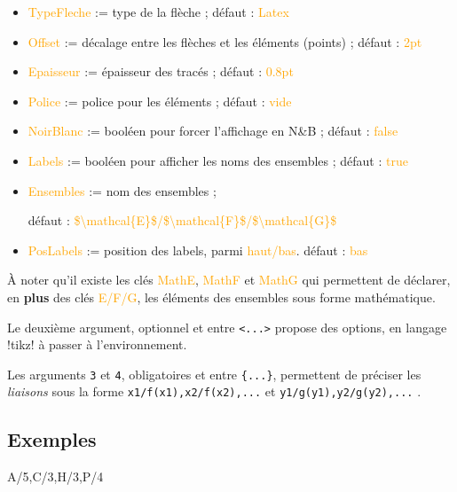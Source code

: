 \documentclass[french,a4paper,11pt]{article}
\newcommand\Cle[1]{{\small\sffamily\textlangle \textcolor{orange}{#1}\textrangle}}
\begin{document}
{{\begin{tipblock}
\begin{itemize}
	\hfill{}défaut : \Cle{teal}
	\item \Cle{TypeFleche} := type de la flèche  ; \hfill{}défaut : \Cle{Latex}
	\item \Cle{Offset} := décalage entre les flèches et les éléments (points) ; \hfill{}défaut : \Cle{2pt}
	\item \Cle{Epaisseur} := épaisseur des tracés ; \hfill{}défaut : \Cle{0.8pt}
	\item \Cle{Police} := police pour les éléments ; \hfill{}défaut : \Cle{vide}
	\item \Cle{NoirBlanc} := booléen pour forcer l'affichage en N\&{}B ; \hfill{}défaut : \Cle{false}
	\item \Cle{Labels} := booléen pour afficher les noms des ensembles ; \hfill{}défaut : \Cle{true}
	\item \Cle{Ensembles} := nom des ensembles  ;

	\hfill{}défaut : \Cle{\$\textbackslash mathcal\{E\}\$/\$\textbackslash  mathcal\{F\}\$/\$\textbackslash  mathcal\{G\}\$}
	\item \Cle{PosLabels} := position des labels, parmi \Cle{haut/bas}. \hfill{}défaut : \Cle{bas}
\end{itemize}

À noter qu'il existe les clés \Cle{MathE}, \Cle{MathF} et \Cle{MathG} qui permettent de déclarer, en \textbf{plus} des clés \Cle{E/F/G}, les éléments des ensembles sous forme mathématique.

\smallskip

Le deuxième argument, optionnel et entre \texttt{<...>} propose des options, en langage \packagetex!tikz! à passer à l'environnement.

\smallskip

Les arguments \texttt{3} et \texttt{4}, obligatoires et entre \texttt{\{...\}}, permettent de préciser les \textit{liaisons} sous la forme \verb!x1/f(x1),x2/f(x2),...! et \verb!y1/g(y1),y2/g(y2),...! .
\end{tipblock}

\subsection{Exemples}

\begin{DemoCode}[]
%
	{A/5,C/3,H/3,P/4}%
\end{DemoCode}

}}
\end{document}
